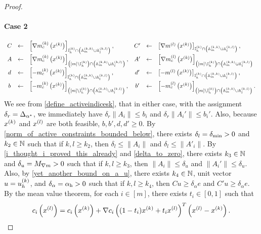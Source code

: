 \begin{proof}
\paragraph{Case 2}
\begin{align*}
\begin{array}{cclccl}
C  &\gets& \left[\nabla m^{(k)}_c\left(x^{(k)}\right)\right]_{{ \mathbb I_h^{(k)} } \cap \left({\mathbb A_m^{(k, k)}} \cup {\mathbb A_l^{(k, l)}} \right)}, &
C' &\gets& \left[\nabla m^{(l)}\left(x^{(k)}\right)\right]_{{ \mathbb I_h^{(k)} } \cap \left({\mathbb A_m^{(k, k)}} \cup {\mathbb A_l^{(k, l)}} \right)}, \\
A  &\gets& \left[\nabla m^{(k)}_c\left(x^{(k)}\right)\right]_{\left([m] \setminus { \mathbb I_h^{(k)} }\right) \cap \left({\mathbb A_m^{(k, k)}} \cup {\mathbb A_l^{(k, l)}} \right)}, &
A' &\gets& \left[\nabla m^{(l)}_c\left(x^{(k)}\right)\right]_{\left([m] \setminus { \mathbb I_h^{(k)} }\right) \cap \left({\mathbb A_m^{(k, k)}} \cup {\mathbb A_l^{(k, l)}} \right)} \\
d  &\gets& \left[-m^{(k)}_c\left(x^{(k)}\right)\right]_{{ \mathbb I_h^{(k)} } \cap \left({\mathbb A_m^{(k, k)}} \cup {\mathbb A_l^{(k, l)}} \right)}, &
d' &\gets& \left[-m^{(l)}\left(x^{(k)}\right)\right]_{{ \mathbb I_h^{(k)} } \cap \left({\mathbb A_m^{(k, k)}} \cup {\mathbb A_l^{(k, l)}} \right)}, \\
b  &\gets& \left[-m^{(k)}_c\left(x^{(k)}\right)\right]_{\left([m] \setminus { \mathbb I_h^{(k)} }\right) \cap \left({\mathbb A_m^{(k, k)}} \cup {\mathbb A_l^{(k, l)}} \right)}, &
b' &\gets& \left[-m^{(l)}_c\left(x^{(k)}\right)\right]_{\left([m] \setminus { \mathbb I_h^{(k)} }\right) \cap \left({\mathbb A_m^{(k, k)}} \cup {\mathbb A_l^{(k, l)}} \right)}.
\end{array}
\end{align*}
We see from \cref{define_activeindicesk}, that in either case, with the assignment $\delta_r = {\Delta_{\alpha^{\star}}}$, we immediately have 
$\delta_r \|A_i\| \le b_i$ and $\delta_r \|A_i'\| \le b_i'$.
Also, because $x^{(k)}$ and ${x^{(l)}}$ are both feasible, $b, b', d, d' \ge 0$.
By \cref{norm_of_active_constraints_bounded_below}, there exists $\delta_l = {\delta_{\textrm{min}}} > 0$ and $k_2 \in \mathbb N$ such that if $k, l \ge k_2$, then
$\delta_l \le \|A_i\|$ and $\delta_l \le \|A'_i\|$.
By \cref{i_thought_i_proved_this_already} and \cref{delta_to_zero}, there exists $k_3 \in \mathbb N$ and $\delta_u = {M_{\nabla m}} > 0$ such that if $k, l \ge k_3$,
then
$\|A_i\| \le \delta_u$ and $\|A_i'\| \le \delta_u$.
Also, by \cref{yet_another_bound_on_a_u}, there exists $k_4 \in \mathbb N$, unit vector $u = { u_{h}^{(k)} }$, and $\delta_{\alpha} = { \alpha_{\textrm{h}} } > 0$ 
such that if $k, l \ge k_4$, then
$Cu \ge \delta_{\alpha} e$ and $C'u \ge \delta_{\alpha} e$.
By the mean value theorem, for each $i \in [m]$, there exists $t_i \in [0, 1]$ such that
\begin{align*}
c_i\left(\xl\right) = c_i\left(\xk\right) + \nabla c_i\left((1 - t_i)\xk + t_i \xl\right)^T\left(\xl - \xk\right).

\end{align*}
\end{proof}
